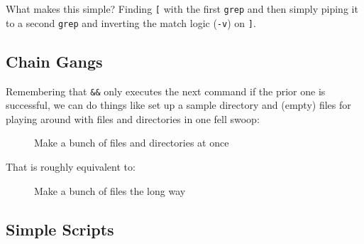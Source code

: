\documentclass[10pt,american,]{book}
\newenvironment{Shaded}{\begin{snugshade}}{\end{snugshade}}
\newcommand{\KeywordTok}[1]{\textcolor[rgb]{0.13,0.29,0.53}{\textbf{{#1}}}}
\newcommand{\NormalTok}[1]{{#1}}
\numberwithin{figure}{chapter}
\DeclareRobustCommand{\drcap}[1]{\begin{figure}[H]\caption{#1}\end{figure}}
\renewcommand{\KeywordTok}[1]{{#1}}
\renewcommand{\NormalTok}[1]{{#1}}
\begin{document}
What makes this simple? Finding \texttt{{[}} with the first
\texttt{grep} and then simply piping it to a second \texttt{grep} and
inverting the match logic (\texttt{-v}) on \texttt{{]}}.

\subsection*{Chain Gangs}\label{chain-gangs}

Remembering that
\texttt{\&\&}
only executes the next command if the prior one is successful, we can do
things like set up a sample directory and (empty) files for playing
around with files and directories in one fell swoop:

\drcap{Make a bunch of files and directories at once}

\begin{Shaded}
\end{Shaded}

That is roughly equivalent to:

\drcap{Make a bunch of files the long way}

\begin{Shaded}
\end{Shaded}

\subsection*{Simple Scripts}\label{simple-scripts}
\end{document}

